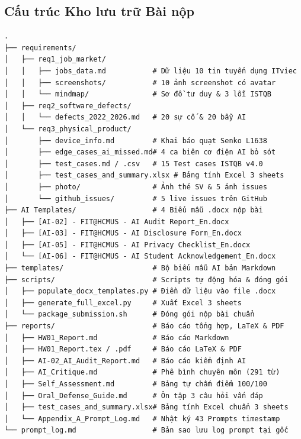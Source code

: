\documentclass[11pt,a4paper]{article}
\begin{document}
\subsection{Cấu trúc Kho lưu trữ Bài nộp}
\begin{tcolorbox}[title=\textbf{Cây thư mục tổ chức dự án HW01}]
\fontsize{7.8pt}{9.5pt}\selectfont
\begin{verbatim}
.
├── requirements/
│   ├── req1_job_market/
│   │   ├── jobs_data.md           # Dữ liệu 10 tin tuyển dụng ITviec
│   │   ├── screenshots/           # 10 ảnh screenshot có avatar
│   │   └── mindmap/               # Sơ đồ tư duy & 3 lỗi ISTQB
│   ├── req2_software_defects/
│   │   └── defects_2022_2026.md   # 20 sự cố & 20 bẫy AI
│   └── req3_physical_product/
│       ├── device_info.md         # Khai báo quạt Senko L1638
│       ├── edge_cases_ai_missed.md# 4 ca biên cơ điện AI bỏ sót
│       ├── test_cases.md / .csv   # 15 Test cases ISTQB v4.0
│       ├── test_cases_and_summary.xlsx # Bảng tính Excel 3 sheets
│       ├── photo/                 # Ảnh thẻ SV & 5 ảnh issues
│       └── github_issues/         # 5 live issues trên GitHub
├── AI Templates/                  # 4 Biểu mẫu .docx nộp bài
│   ├── [AI-02] - FIT@HCMUS - AI Audit Report_En.docx
│   ├── [AI-03] - FIT@HCMUS - AI Disclosure Form_En.docx
│   ├── [AI-05] - FIT@HCMUS - AI Privacy Checklist_En.docx
│   └── [AI-06] - FIT@HCMUS - AI Student Acknowledgement_En.docx
├── templates/                     # Bộ biểu mẫu AI bản Markdown
├── scripts/                       # Scripts tự động hóa & đóng gói
│   ├── populate_docx_templates.py # Điền dữ liệu vào file .docx
│   ├── generate_full_excel.py     # Xuất Excel 3 sheets
│   └── package_submission.sh      # Đóng gói nộp bài chuẩn
├── reports/                       # Báo cáo tổng hợp, LaTeX & PDF
│   ├── HW01_Report.md             # Báo cáo Markdown
│   ├── HW01_Report.tex / .pdf     # Báo cáo LaTeX & PDF
│   ├── AI-02_AI_Audit_Report.md   # Báo cáo kiểm định AI
│   ├── AI_Critique.md             # Phê bình chuyên môn (291 từ)
│   ├── Self_Assessment.md         # Bảng tự chấm điểm 100/100
│   ├── Oral_Defense_Guide.md      # Ôn tập 3 câu hỏi vấn đáp
│   ├── test_cases_and_summary.xlsx# Bảng tính Excel chuẩn 3 sheets
│   └── Appendix_A_Prompt_Log.md   # Nhật ký 43 Prompts timestamp
└── prompt_log.md                  # Bản sao lưu log prompt tại gốc
\end{verbatim}
\end{tcolorbox}

\end{document}
